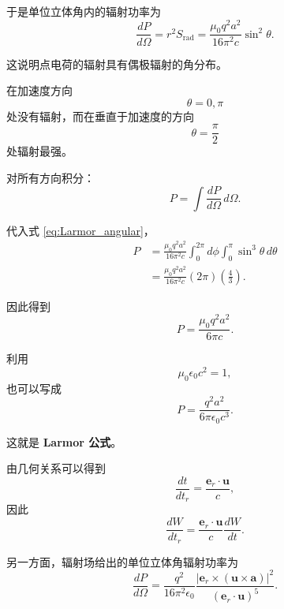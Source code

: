 于是单位立体角内的辐射功率为
\begin{equation}
    \boxed{
    \frac{dP}{d\Omega}
    =
    r^2S_{\mathrm{rad}}
    =
    \frac{\mu_0q^2a^2}
    {16\pi^2c}
    \sin^2\theta
    }.
    \label{eq:Larmor_angular}
\end{equation}

这说明点电荷的辐射具有偶极辐射的角分布。

在加速度方向
\begin{equation}
    \theta=0,\pi
\end{equation}
处没有辐射，而在垂直于加速度的方向
\begin{equation}
    \theta=\frac{\pi}{2}
\end{equation}
处辐射最强。

对所有方向积分：
\begin{equation}
    P
    =
    \int
    \frac{dP}{d\Omega}\,d\Omega.
\end{equation}

代入式 \eqref{eq:Larmor_angular}，
\begin{align}
    P
    &=
    \frac{\mu_0q^2a^2}{16\pi^2c}
    \int_0^{2\pi}d\phi
    \int_0^\pi
    \sin^3\theta\,d\theta
    \\
    &=
    \frac{\mu_0q^2a^2}{16\pi^2c}
    (2\pi)
    \left(\frac{4}{3}\right).
\end{align}

因此得到
\begin{equation}
    \boxed{
    P
    =
    \frac{\mu_0q^2a^2}{6\pi c}
    }.
    \label{eq:Larmor}
\end{equation}

利用
\begin{equation}
    \mu_0\epsilon_0c^2=1,
\end{equation}
也可以写成
\begin{equation}
    \boxed{
    P
    =
    \frac{q^2a^2}
    {6\pi\epsilon_0c^3}
    }.
\end{equation}

这就是
\textbf{Larmor 公式}。

由几何关系可以得到
\begin{equation}
    \frac{dt}{dt_r}
    =
    \frac{\boldsymbol{e}_r\cdot\boldsymbol u}{c},
\end{equation}
因此
\begin{equation}
    \frac{dW}{dt_r}
    =
    \frac{\boldsymbol{e}_r\cdot\boldsymbol u}{c}
    \frac{dW}{dt}.
\end{equation}

另一方面，辐射场给出的单位立体角辐射功率为
\begin{equation}
    \boxed{
    \frac{dP}{d\Omega}
    =
    \frac{q^2}{16\pi^2\epsilon_0}
    \frac{
        \left|
        \boldsymbol{e}_r
        \times
        (\boldsymbol u\times\boldsymbol a)
        \right|^2
    }
    {(\boldsymbol{e}_r\cdot\boldsymbol u)^5}
    }.
    \label{eq:Lienard_angular}
\end{equation}

